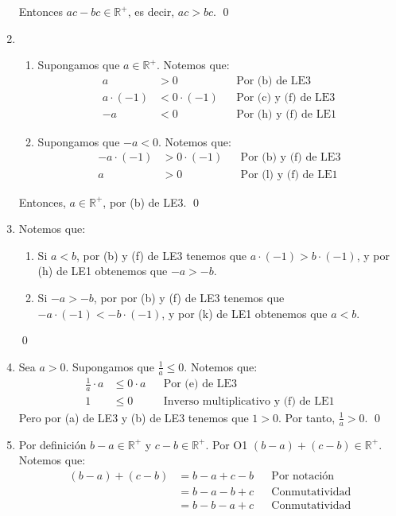 \documentclass[11pt]{article}
\newcommand{\R}{\mathbb{R}}
\begin{document}
\begin{enumerate}[label=\alph*)]
Entonces $ac - bc \in \R^+$, es decir, $ac>bc$. \qed
\item
    \begin{enumerate}[label=\roman*)]
    \item Supongamos que $a \in \R^+$. Notemos que:
    \begin{align*}
        a &> 0 && \text{Por (b) de LE3}\\
        a \cdot (-1) &< 0 \cdot (-1) && \text{Por (c) y (f) de LE3}\\
        -a &< 0 && \text{Por (h) y (f) de LE1}
    \end{align*}
    \item Supongamos que $-a<0$. Notemos que:
    \begin{align*}
        -a \cdot (-1) &> 0 \cdot (-1) && \text{Por (b) y (f) de LE3}\\
        a &> 0 && \text{Por (l) y (f) de LE1}
    \end{align*}
    \end{enumerate} Entonces, $a \in \R^+$, por (b) de LE3. \qed
\item Notemos que:
    \begin{enumerate}[label=\roman*)]
        \item Si $a<b$, por (b) y (f) de LE3 tenemos que $a \cdot (-1) > b \cdot (-1)$, y por (h) de LE1 obtenemos que $-a > -b$.
        \item Si $-a > -b$, por por (b) y (f) de LE3 tenemos que $-a \cdot (-1) < -b \cdot (-1)$, y por (k) de LE1 obtenemos que $a<b$.
    \end{enumerate} \qed
\item Sea $a>0$. Supongamos que $\frac{1}{a} \leq 0$. Notemos que:
    \begin{align*}
        \frac{1}{a} \cdot a &\leq 0 \cdot a && \text{Por (e) de LE3}\\
        1 &\leq 0 && \text{Inverso multiplicativo y (f) de LE1}
    \end{align*}
    Pero por (a) de LE3 y (b) de LE3 tenemos que $1>0$. Por tanto, $\frac{1}{a} > 0$. \qed
\item Por definición $b-a \in \R^+$ y $c-b \in \R^+$. Por O1 $(b-a) + (c-b) \in \R^+$. Notemos que:
    \begin{align*}
        (b-a) + (c-b) &= b - a + c -b && \text{Por notación}\\
        &= b-a -b+c && \text{Conmutatividad}\\
        &= b-b -a+c && \text{Conmutatividad}\\

\end{align*}
\end{enumerate}
\end{document}
